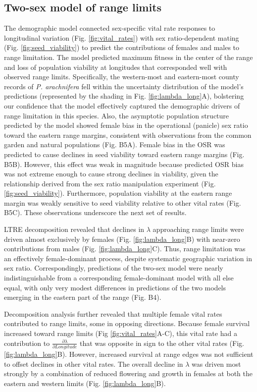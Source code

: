 \documentclass[11pt]{article}\usepackage[]{graphicx}\usepackage[]{color}
\newcommand{\revise}[1]{{\color{Black}{#1}}}
\begin{document}
\subsection*{Two-sex model of range limits}
The \revise{process-based} demographic model connected sex-specific vital rate responses to longitudinal variation (Fig. \ref{fig:vital_rates}) with sex ratio-dependent mating (Fig. \ref{fig:seed_viability}) to predict the contributions of females and males to range limitation. 
The model predicted maximum fitness in the center of the range and loss of population viability at longitudes that corresponded well with observed range limits. 
Specifically, the western-most and eastern-most county records of \textit{P. arachnifera} fell within the uncertainty distribution of the model's predictions (represented by the shading in Fig. \ref{fig:lambda_long}A), bolstering our confidence that the model effectively captured the demographic drivers of range limitation in this species. 
Also, the asymptotic population structure predicted by the model showed female bias in the operational (panicle) sex ratio toward the eastern range margins, consistent with observations from the common garden and natural populations (Fig. B5A). 
Female bias in the OSR was predicted to cause declines in seed viability toward eastern range margins (Fig. B5B).
However, this effect was weak in magnitude because predicted OSR bias was not extreme enough to cause strong declines in viability, given the relationship derived from the sex ratio manipulation experiment (Fig. \ref{fig:seed_viability}). 
Furthermore, population viability at the eastern range margin was weakly sensitive to seed viability relative to other vital rates (Fig. B5C). 
These observations underscore the next set of results. 

LTRE decomposition revealed that declines in $\lambda$ approaching range limits were driven almost exclusively by females (Fig. \ref{fig:lambda_long}B) with near-zero contributions from males (Fig. \ref{fig:lambda_long}C). 
Thus, range limitation was an effectively female-dominant process, despite systematic geographic variation in sex ratio. 
Correspondingly, predictions of the two-sex model were nearly indistinguishable from a corresponding female-dominant model with all else equal, with only very modest differences in predictions of the two models emerging in the eastern part of the range (Fig. B4). 

Decomposition analysis further revealed that multiple female vital rates contributed to range limits, some in opposing directions. 
Because female survival increased toward range limits (Fig \ref{fig:vital_rates}A-C), this vital rate had a contribution to $\frac{\partial \lambda}{\partial Longitude}$ that was opposite in sign to the other vital rates (Fig. \ref{fig:lambda_long}B). 
However, increased survival at range edges was not sufficient to offset declines in other vital rates. 
The overall decline in $\lambda$ was driven most strongly by a combination of reduced flowering and growth in females at both the eastern and western limits (Fig. \ref{fig:lambda_long}B). 
\end{document}
